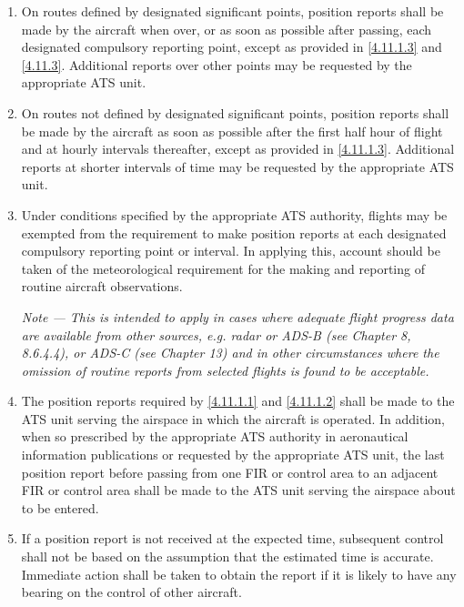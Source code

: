 \documentclass[../main.tex]{subfiles}
\begin{document}
    \begin{enumerate}
        \item \label{4.11.1.1} On routes defined by designated significant points, position reports shall be made by the aircraft when over, or as soon as possible after passing, each designated compulsory reporting point, except as provided in \ref{4.11.1.3} and \ref{4.11.3}. Additional reports over other points may be requested by the appropriate ATS unit.
        \item \label{4.11.1.2} On routes not defined by designated significant points, position reports shall be made by the aircraft as soon as possible after the first half hour of flight and at hourly intervals thereafter, except as provided in \ref{4.11.1.3}. Additional reports at shorter intervals of time may be requested by the appropriate ATS unit.
        \item \label{4.11.1.3} Under conditions specified by the appropriate ATS authority, flights may be exempted from the requirement to make position reports at each designated compulsory reporting point or interval. In applying this, account should be taken of the meteorological requirement for the making and reporting of routine aircraft observations.

        \textit{Note --- This is intended to apply in cases where adequate flight progress data are available from other sources, e.g. radar or ADS-B (see Chapter 8, 8.6.4.4), or ADS-C (see Chapter 13) and in other circumstances where the omission of routine reports from selected flights is found to be acceptable.}

        \item The position reports required by \ref{4.11.1.1} and \ref{4.11.1.2} shall be made to the ATS unit serving the airspace in which the aircraft is operated. In addition, when so prescribed by the appropriate ATS authority in aeronautical information publications or requested by the appropriate ATS unit, the last position report before passing from one FIR or control area to an adjacent FIR or control area shall be made to the ATS unit serving the airspace about to be entered.
        \item If a position report is not received at the expected time, subsequent control shall not be based on the assumption that the estimated time is accurate. Immediate action shall be taken to obtain the report if it is likely to have any bearing on the control of other aircraft.
    \end{enumerate}
\end{document}
